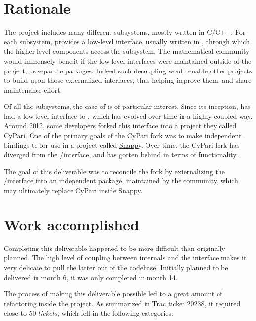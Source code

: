 \documentclass{deliverablereport}
\author{Luca De Feo, Vincent Delecroix and Jeroen Demeyer}
\begin{document}
\enlargethispage{4ex}
\maketitle
\githubissuedescription
\tableofcontents\newpage


\section{Rationale}

The \Sage project includes many different subsystems, mostly written
in C/C++. For each subsystem, \Sage provides a low-level interface,
usually written in \Cython, through which the higher level components
access the subsystem. The mathematical community would immensely
benefit if the low-level interfaces were maintained outside of the
\Sage project, as separate \Python packages. Indeed such decoupling
would enable other \Python projects to build upon those externalized
interfaces, thus helping improve them, and share maintenance effort.

Of all the subsystems, the case of \Pari is of particular
interest. Since its inception, \Sage has had a low-level \Cython
interface to \Pari, which has evolved over time in a highly coupled
way. Around 2012, some \Sage developers forked this interface into a
project they called
\href{https://bitbucket.org/t3m/cypari/}{CyPari}. One of the primary
goals of the CyPari fork was to make independent \Python bindings to
\Pari for use in a project called
\href{https://bitbucket.org/t3m/snappy}{Snappy}. Over time, the CyPari
fork has diverged from the \Sage/\Pari interface, and has gotten
behind in terms of functionality.

The goal of this deliverable was to reconcile the fork by
externalizing the \Sage/\Pari interface into an independent package,
maintained by the \Sage community, which may ultimately replace CyPari
inside Snappy. 


\section{Work accomplished}

Completing this deliverable happened to be more difficult than
originally planned. The high level of coupling between \Sage internals
and the \Pari interface makes it very delicate to pull the latter out
of the \Sage codebase. Initially planned to be delivered in month 6,
it was only completed in month 14.

The process of making this deliverable possible led to a great amount
of refactoring inside the \Sage project. As summarized in
\href{http://trac.sagemath.org/ticket/20238}{Trac ticket 20238}, it
required close to 50 \emph{tickets}, which fell in the following
categories:
\end{document}

